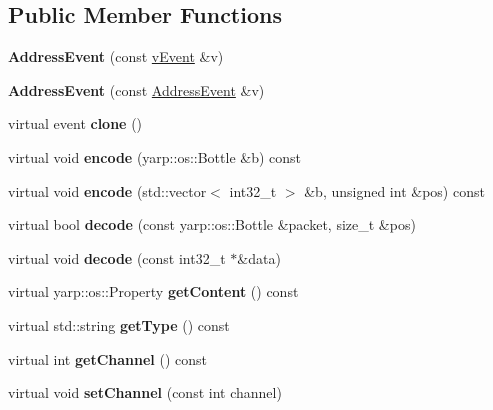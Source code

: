 \subsection*{Public Member Functions}
\begin{DoxyCompactItemize}
\item 
\mbox{\label{classev_1_1AddressEvent_a62e810ce50e155828957e61c99a165d2}} 
{\bfseries Address\+Event} (const \hyperlink{classev_1_1vEvent}{v\+Event} \&v)
\item 
\mbox{\label{classev_1_1AddressEvent_a5072b43ca93fdcdf0294ecff78f3b424}} 
{\bfseries Address\+Event} (const \hyperlink{classev_1_1AddressEvent}{Address\+Event} \&v)
\item 
\mbox{\label{classev_1_1AddressEvent_adabe75246de88f722d65b4994c7955eb}} 
virtual event {\bfseries clone} ()
\item 
\mbox{\label{classev_1_1AddressEvent_a88fd7ed5398113959b148b3ff48dc9bb}} 
virtual void {\bfseries encode} (yarp\+::os\+::\+Bottle \&b) const
\item 
\mbox{\label{classev_1_1AddressEvent_ab61870d54423584f9c1c5e48bf989df9}} 
virtual void {\bfseries encode} (std\+::vector$<$ int32\+\_\+t $>$ \&b, unsigned int \&pos) const
\item 
\mbox{\label{classev_1_1AddressEvent_aadf6cc5f4681b4c4028ac2be4317ed55}} 
virtual bool {\bfseries decode} (const yarp\+::os\+::\+Bottle \&packet, size\+\_\+t \&pos)
\item 
\mbox{\label{classev_1_1AddressEvent_a0f898c7319ceb94bf6c5eb688ef1df46}} 
virtual void {\bfseries decode} (const int32\+\_\+t $\ast$\&data)
\item 
\mbox{\label{classev_1_1AddressEvent_a8defcdc4c7ab81cae0c608ef3d5c1dec}} 
virtual yarp\+::os\+::\+Property {\bfseries get\+Content} () const
\item 
\mbox{\label{classev_1_1AddressEvent_ab052f9d6d9ba89660e2e1c1e3dff07e9}} 
virtual std\+::string {\bfseries get\+Type} () const
\item 
\mbox{\label{classev_1_1AddressEvent_a4f0e15a8300d1018cbb813fa83aedb43}} 
virtual int {\bfseries get\+Channel} () const
\item 
\mbox{\label{classev_1_1AddressEvent_a50e188b1c5702cab67a2175b81c32767}} 
virtual void {\bfseries set\+Channel} (const int channel)
\end{DoxyCompactItemize}
